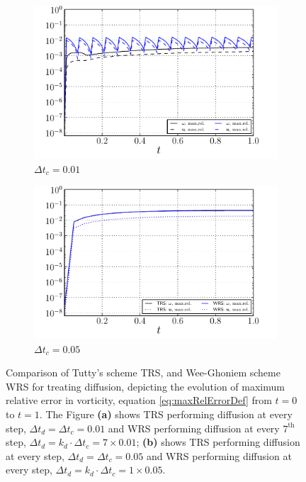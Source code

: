 \begin{figure}[!t]
  \centering
  \begin{subfigure}[b]{0.45\textwidth}
          \includegraphics[width=\textwidth]{figures/lagrangian/lambOseen_errorEvolution_WRSvsTRS_dt0p01.pdf}
          \caption{$\Delta t_c = 0.01$}
          \label{fig:lambOseen_errorEvolution_WRSvsTRS_dt0p01}
  \end{subfigure}%
  \qquad %
  \begin{subfigure}[b]{0.45\textwidth}
          \includegraphics[width=\textwidth]{figures/lagrangian/lambOseen_errorEvolution_WRSvsTRS_dt0p05.pdf}
          \caption{$\Delta t_c = 0.05$}
          \label{fig:lambOseen_errorEvolution_WRSvsTRS_dt0p05}
  \end{subfigure}
  
  \caption{Comparison of Tutty's scheme TRS, and Wee-Ghoniem scheme WRS for treating diffusion, depicting the evolution of maximum relative error in vorticity, equation \ref{eq:maxRelErrorDef} from $t=0$ to $t=1$. The Figure \textbf{(a)} shows TRS performing diffusion at every step, $\Delta t_d=\Delta t_c = 0.01$ and WRS performing diffusion at every $7^{\mathrm{th}}$ step, $\Delta t_d = k_d\cdot\Delta t_c = 7\times0.01$; \textbf{(b)} shows TRS performing diffusion at every step, $\Delta t_d=\Delta t_c = 0.05$ and WRS performing diffusion at every step, $\Delta t_d = k_d\cdot\Delta t_c = 1\times0.05$.}
  \label{fig:lambOseen_diffusionMethod_comparison}
 \end{figure}

